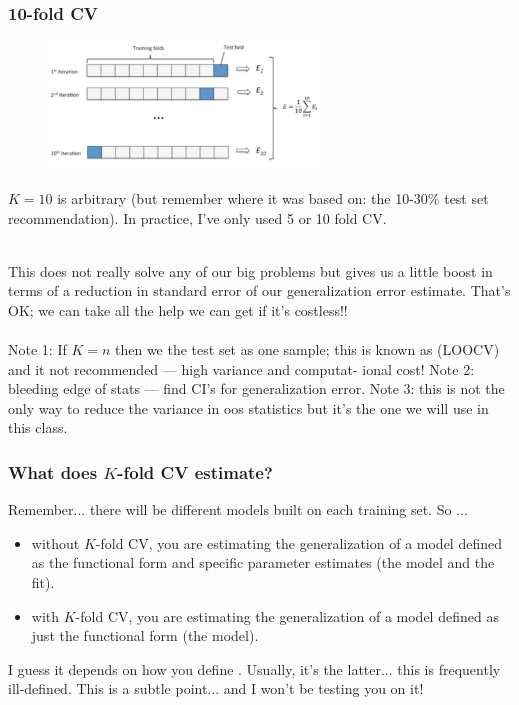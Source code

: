 \documentclass[handout]{beamer}
\begin{document}
\begin{frame}\frametitle{10-fold CV}

\begin{figure}
\centering
\includegraphics[width=2.9in]{10_fold_cv2.png}
\end{figure}

\vspace{-0.3cm}
\small\pause
$K=10$ is arbitrary (but remember where it was based on: the 10-30\% test set recommendation). In practice, I've only used 5 or 10 fold CV. \\~\\ \pause

\vspace{-0.3cm}
This does not really solve any of our big problems but gives us a little boost in terms of a reduction in standard error of our generalization error estimate. \pause That's OK; we can take all the help we can get if it's costless!! \\~\\

\vspace{-0.4cm}\footnotesize
Note 1: If $K=n$ then we the test set as one sample; this is known as  (LOOCV) and it not recommended --- high variance and \pause computat- ional cost! \pause Note 2: bleeding edge of stats --- find CI's for generalization error. \pause Note 3: this is not the only way to reduce the variance in oos statistics but it's the one we will use in this class.

	
\end{frame}


\begin{frame}\frametitle{What does $K$-fold CV estimate?}

Remember... there will be different models built on each training set. So ...

\begin{itemize}
\item without $K$-fold CV, you are estimating the generalization of a model defined as the functional form and specific parameter estimates (the model and the fit). \pause
\item with $K$-fold CV, you are estimating the generalization of a model defined as just the functional form (the model).\pause
\end{itemize}

I guess it depends on how you define . Usually, it's the latter... this is frequently ill-defined. This is a subtle point... and I won't be testing you on it!

\end{frame}
\end{document}
